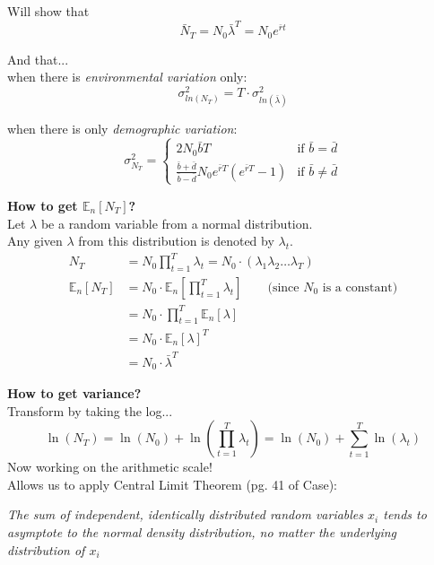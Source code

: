\documentclass{article}
\begin{document}
Will show that
\begin{equation*}
	\bar{N}_T = N_0 \bar{\lambda}^T = N_0 e^{\bar{r}t}
\end{equation*}

And that...\\
when there is \emph{environmental variation} only:
\begin{equation*}
	\sigma^2_{ln(N_T)}=T \cdot \sigma^2_{ln(\bar{\lambda})}
\end{equation*}

when there is only \emph{demographic variation}:
\begin{equation*}
  \sigma_{N_T}^2 =
  \begin{cases} 
        2N_0 \bar{b} T & \text{if } \bar{b}=\bar{d} \\
        \frac{\bar{b}+\bar{d}}{\bar{b}-\bar{d}} N_0 e^{\bar{r}T}(e^{\bar{r}T}-1) & \text{if } \bar{b} \neq \bar{d}
    \end{cases}
 \end{equation*}

\pagebreak

\textbf{How to get $\mathbb{E}_n[N_T]$?}\\
Let $\lambda$ be a random variable from a normal distribution.\\
Any given $\lambda$ from this distribution is denoted by $\lambda_t$.
\begin{align*}
	N_T &= N_0 \prod_{t=1}^T \lambda_t = N_0 \cdot (\lambda_1 \lambda_2 \dots \lambda_T)\\
	\mathbb{E}_n[N_T] &= N_0 \cdot \mathbb{E}_n\left[\prod_{t=1}^T \lambda_t \right] \qquad \text{(since } N_0 \text{ is a constant)}\\
		& = N_0 \cdot \prod_{t=1}^T \mathbb{E}_n[\lambda]\\
		& = N_0 \cdot \mathbb{E}_n[\lambda]^T\\
		& = N_0 \cdot \bar{\lambda}^T
\end{align*}

\textbf{How to get variance?}\\
Transform by taking the log...\\
\begin{equation*}
	\ln(N_T)=\ln(N_0)+\ln\left(\prod_{t=1}^T \lambda_t\right) =\ln(N_0)+ \boxed{ \sum_{t=1}^T \ln(\lambda_t)}
\end{equation*}
Now working on the arithmetic scale!\\
Allows us to apply Central Limit Theorem (pg. 41 of Case):
\begin{center}
	\emph{The sum of independent, identically distributed random variables $x_i$ tends to asymptote to the normal density distribution, no matter the underlying distribution of $x_i$}
\end{center}
\end{document}
